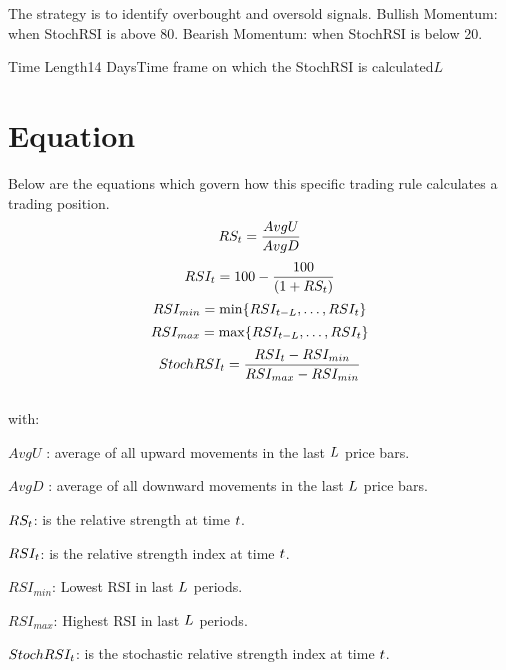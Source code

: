 \documentclass{article}
\begin{document}
\logo
{} %
\tblofcontents

\howtotrade
The strategy is to identify overbought and oversold signals.
Bullish Momentum: when StochRSI is above 80.
Bearish Momentum: when StochRSI is below 20.

{Time Length}{14 Days}{Time frame on which the StochRSI is calculated}{$L$}
\stoptable %

\newpage
\section{Equation}
Below are the equations which govern how this specific trading rule calculates a trading position.
\begin{equation}
    RS_{t} = \frac{AvgU}{AvgD}
\end{equation}
\begin{equation}
RSI_{t} = 100-\frac{100}{(1+RS_{t})}
\end{equation}
\begin{equation}
RSI_{min} = \min\{RSI_{t-L},\ldots,RSI_{t}\}
\end{equation}
\begin{equation}
RSI_{max} = \max\{RSI_{t-L},\ldots,RSI_{t}\}
\end{equation}
\begin{equation}
    StochRSI_{t} = \frac{RSI_{t} - RSI_{min}}{RSI_{max} - RSI_{min}}
\end{equation}
\\
with:

$AvgU$ : average of all upward movements in the last $L$ price bars.

$AvgD$ : average of all downward movements in the last $L$ price bars.

$RS_{t}$: is the relative strength at time $t$.

$RSI_{t}$: is the relative strength index at time $t$.

$RSI_{min}$: Lowest RSI in last $L$ periods.

$RSI_{max}$: Highest RSI in last $L$ periods.

$StochRSI_{t}$: is the stochastic relative strength index at time $t$.

\keyterms
\furtherlinks %
\end{document}
